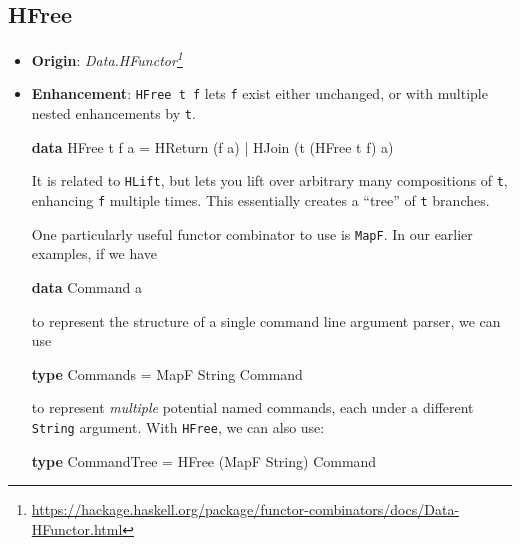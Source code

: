 \documentclass[]{article}
\newenvironment{Shaded}{}{}
\newcommand{\DataTypeTok}[1]{\textcolor[rgb]{0.56,0.13,0.00}{#1}}
\newcommand{\KeywordTok}[1]{\textcolor[rgb]{0.00,0.44,0.13}{\textbf{#1}}}
\newcommand{\NormalTok}[1]{#1}
\newcommand{\OperatorTok}[1]{\textcolor[rgb]{0.40,0.40,0.40}{#1}}
\newcommand{\OtherTok}[1]{\textcolor[rgb]{0.00,0.44,0.13}{#1}}
\renewcommand{\href}[2]{#2\footnote{\url{#1}}}
\begin{document}
\subsection{HFree}\label{hfree}

\begin{itemize}
\item
  \textbf{Origin}:
  \emph{\href{https://hackage.haskell.org/package/functor-combinators/docs/Data-HFunctor.html}{Data.HFunctor}}
\item
  \textbf{Enhancement}: \texttt{HFree\ t\ f} lets \texttt{f} exist either
  unchanged, or with multiple nested enhancements by \texttt{t}.

\begin{Shaded}
\begin{Highlighting}[]
\KeywordTok{data} \DataTypeTok{HFree}\NormalTok{ t f a}
    \OtherTok{=} \DataTypeTok{HReturn}\NormalTok{ (f a)}
    \OperatorTok{|} \DataTypeTok{HJoin}\NormalTok{   (t (}\DataTypeTok{HFree}\NormalTok{ t f) a)}
\end{Highlighting}
\end{Shaded}

  It is related to \texttt{HLift}, but lets you lift over arbitrary many
  compositions of \texttt{t}, enhancing \texttt{f} multiple times. This
  essentially creates a ``tree'' of \texttt{t} branches.

  One particularly useful functor combinator to use is \texttt{MapF}. In our
  earlier examples, if we have

\begin{Shaded}
\begin{Highlighting}[]
\KeywordTok{data} \DataTypeTok{Command}\NormalTok{ a}
\end{Highlighting}
\end{Shaded}

  to represent the structure of a single command line argument parser, we can
  use

\begin{Shaded}
\begin{Highlighting}[]
\KeywordTok{type} \DataTypeTok{Commands} \OtherTok{=} \DataTypeTok{MapF} \DataTypeTok{String} \DataTypeTok{Command}
\end{Highlighting}
\end{Shaded}

  to represent \emph{multiple} potential named commands, each under a different
  \texttt{String} argument. With \texttt{HFree}, we can also use:

\begin{Shaded}
\begin{Highlighting}[]
\KeywordTok{type} \DataTypeTok{CommandTree} \OtherTok{=} \DataTypeTok{HFree}\NormalTok{ (}\DataTypeTok{MapF} \DataTypeTok{String}\NormalTok{) }\DataTypeTok{Command}
\end{Highlighting}
\end{Shaded}


\end{itemize}
\end{document}
